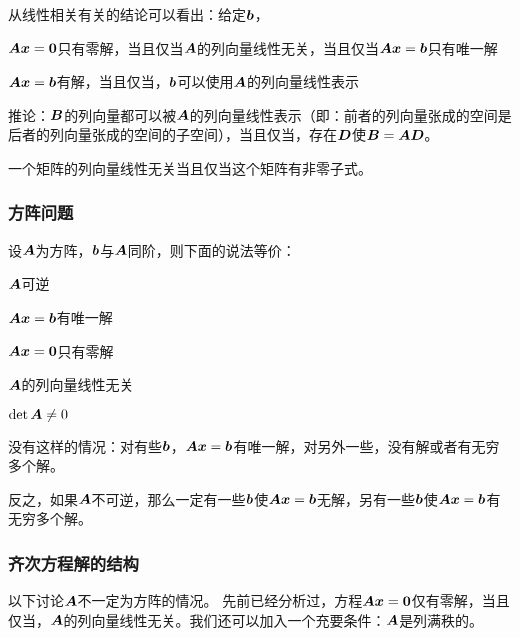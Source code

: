 \documentclass[UTF8]{ctexart}
\theoremstyle{definition}
\renewenvironment{itemize}{\begin{compactitem}}{\end{compactitem}}
\begin{document}
从线性相关有关的结论可以看出：给定$\vb*{b}$， 
\begin{itemize}
    \item $\vb*{A} \vb*{x} = \vb*{0}$只有零解，当且仅当$\vb*{A}$的列向量线性无关，当且仅当$\vb*{A} \vb*{x} = \vb*{b}$只有唯一解
    \item $\vb*{A} \vb*{x} = \vb*{b}$有解，当且仅当，$\vb*{b}$可以使用$\vb*{A}$的列向量线性表示
\end{itemize}


推论：$\vb*{B}$的列向量都可以被$\vb*{A}$的列向量线性表示（即：前者的列向量张成的空间是后者的列向量张成的空间的子空间），当且仅当，存在$\vb*{D}$使$\vb*{B} = \vb*{A} \vb*{D}$。

一个矩阵的列向量线性无关当且仅当这个矩阵有非零子式。

\hypertarget{ux65b9ux9635}{%
\subsubsection{方阵问题}\label{ux65b9ux9635}}

设$\vb*{A}$为方阵，$\vb*{b}$与$\vb*{A}$同阶，则下面的说法等价：
\begin{itemize}
    \item $\vb*{A}$可逆
    \item $\vb*{A} \vb*{x} = \vb*{b}$有唯一解
    \item $\vb*{A} \vb*{x} = \vb*{0}$只有零解
    \item $\vb*{A}$的列向量线性无关 
    \item $\det \vb*{A} \neq 0$
\end{itemize}

没有这样的情况：对有些$\vb*{b}$，$\vb*{A} \vb*{x} = \vb*{b}$有唯一解，对另外一些，没有解或者有无穷多个解。

反之，如果$\vb*{A}$不可逆，那么一定有一些$\vb*{b}$使$\vb*{A} \vb*{x} = \vb*{b}$无解，另有一些$\vb*{b}$使$\vb*{A} \vb*{x} = \vb*{b}$有无穷多个解。

\hypertarget{ux9f50ux6b21ux65b9ux7a0bux89e3ux7684ux7ed3ux6784}{%
\subsubsection{齐次方程解的结构}\label{ux9f50ux6b21ux65b9ux7a0bux89e3ux7684ux7ed3ux6784}}

以下讨论$\vb*{A}$不一定为方阵的情况。
先前已经分析过，方程$\vb*{A} \vb*{x} = \vb*{0}$仅有零解，当且仅当，$\vb*{A}$的列向量线性无关。我们还可以加入一个充要条件：$\vb*{A}$是列满秩的。
\end{document}
